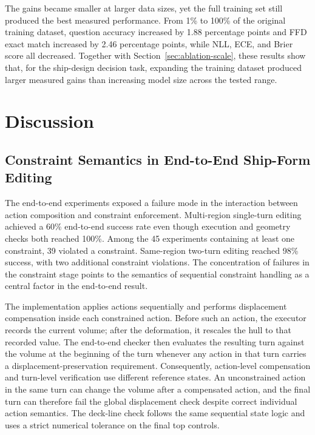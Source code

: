 \documentclass[a4paper,fleqn]{cas-dc}
\begin{document}
The gains became smaller at larger data sizes, yet the full training set still
produced the best measured performance. From 1\% to 100\% of the original
training dataset, question accuracy increased by 1.88 percentage points and FFD
exact match increased by 2.46 percentage points, while NLL, ECE, and Brier score
all decreased. Together with Section~\ref{sec:ablation-scale}, these results
show that, for the ship-design decision task, expanding the training dataset
produced larger measured gains than increasing model size across the tested
range.

\section{Discussion}
\label{sec:discussion}

\subsection{Constraint Semantics in End-to-End Ship-Form Editing}
\label{sec:end2end-discussion}
The end-to-end experiments exposed a failure mode in the interaction between
action composition and constraint enforcement. Multi-region single-turn editing
achieved a 60\% end-to-end success rate even though execution and geometry checks
both reached 100\%. Among the 45 experiments containing at least one constraint,
39 violated a constraint. Same-region two-turn editing reached 98\% success, with
two additional constraint violations. The concentration of failures in the
constraint stage points to the semantics of sequential constraint handling as a
central factor in the end-to-end result.

The implementation applies actions sequentially and performs displacement
compensation inside each constrained action. Before such an action, the executor
records the current volume; after the deformation, it rescales the hull to that
recorded value. The end-to-end checker then evaluates the resulting turn against
the volume at the beginning of the turn whenever any action in that turn carries
a displacement-preservation requirement. Consequently, action-level compensation
and turn-level verification use different reference states. An unconstrained
action in the same turn can change the volume after a compensated action, and the
final turn can therefore fail the global displacement check despite correct
individual action semantics. The deck-line check follows the same sequential
state logic and uses a strict numerical tolerance on the final top controls.
\end{document}
